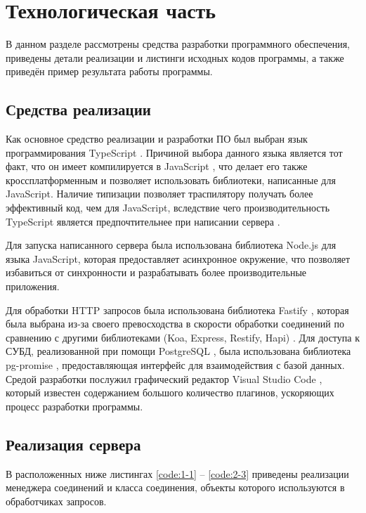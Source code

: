 \section{Технологическая часть}

В  данном  разделе  рассмотрены  средства  разработки  программного
обеспечения, приведены детали реализации и листинги исходных кодов
программы, а также приведён пример результата работы программы.

\subsection{Средства реализации}
Как  основное  средство  реализации  и  разработки  ПО  был  выбран  язык
программирования  TypeScript \cite{ts}.
Причиной  выбора  данного  языка  является  тот факт,  что  он  имеет компилируется в JavaScript \cite{js}, что делает его также кроссплатформенным и позволяет использовать библиотеки, написанные для JavaScript. 
Наличие типизации позволяет траспилятору получать более эффективный код, чем для JavaScript, вследствие чего производительность TypeScript является предпочтительнее при написании сервера \cite{ts-vs-js}.

Для запуска написанного сервера была использована библиотека Node.js \cite{nodejs} для языка JavaScript, которая предоставляет асинхронное окружение, что позволяет избавиться от синхронности и разрабатывать более производительные приложения.

Для обработки HTTP запросов была использована библиотека Fastify \cite{fastify}, которая была выбрана из-за своего превосходства в скорости обработки соединений по сравнению с другими библиотеками (Koa, Express, Restify, Hapi) \cite{fastify-benchmarks}.
Для доступа к СУБД, реализованной при помощи PostgreSQL \cite{postgres}, была использована библиотека pg-promise \cite{pg-promise}, предоставляющая интерфейс для взаимодействия с базой данных.
Средой разработки  послужил  графический  редактор  Visual  Studio  Code \cite{vscode},  который известен  содержанием  большого  количество  плагинов,  ускоряющих  процесс разработки  программы.


\subsection{Реализация сервера}

В  расположенных  ниже  листингах \ref{code:1-1} -- \ref{code:2-3} приведены реализации менеджера соединений и класса соединения, объекты которого используются в обработчиках запросов.
\clearpage

